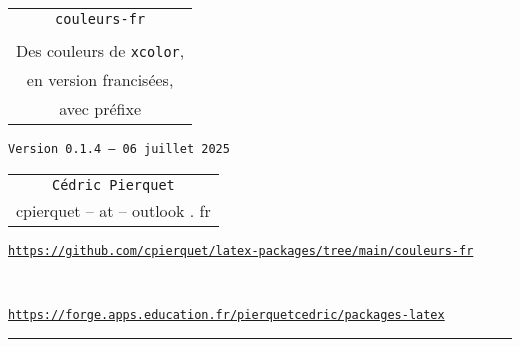 \documentclass[french,11pt,a4paper]{article}
\def\TPversion{0.1.4}
\def\TPdate{06 juillet 2025}
\begin{document}
\pagestyle{fancy}

\thispagestyle{empty}

\begin{center}
	\begin{minipage}{0.75\linewidth}
	\begin{tcolorbox}[colframe=yellow,colback=yellow!15]
		\begin{center}
			\begin{tabular}{c}
				{\Huge \texttt{couleurs-fr}}\\
				\\
				{\LARGE Des couleurs de \texttt{xcolor},} \\
				{\LARGE en version francisées,} \\
				{\LARGE avec préfixe}
			\end{tabular}
			
			\medskip
			
			{\small \texttt{Version \TPversion{} -- \TPdate}}
		\end{center}
	\end{tcolorbox}
\end{minipage}
\end{center}

\begin{center}
	\begin{tabular}{c}
		\texttt{Cédric Pierquet}\\
		{\ttfamily cpierquet -- at -- outlook . fr}
	\end{tabular}
\end{center}

\begin{center}
	\begin{minipage}{0.85\linewidth}
		\begin{tcolorbox}[colframe=teal,colback=teal!10,halign=center,fontupper=\footnotesize]
			\texttt{\url{https://github.com/cpierquet/latex-packages/tree/main/couleurs-fr}}
			
			~
			
			\texttt{\url{https://forge.apps.education.fr/pierquetcedric/packages-latex}}
		\end{tcolorbox}
	\end{minipage}
\end{center}

\hrule

\vspace*{5mm}

\end{document}
